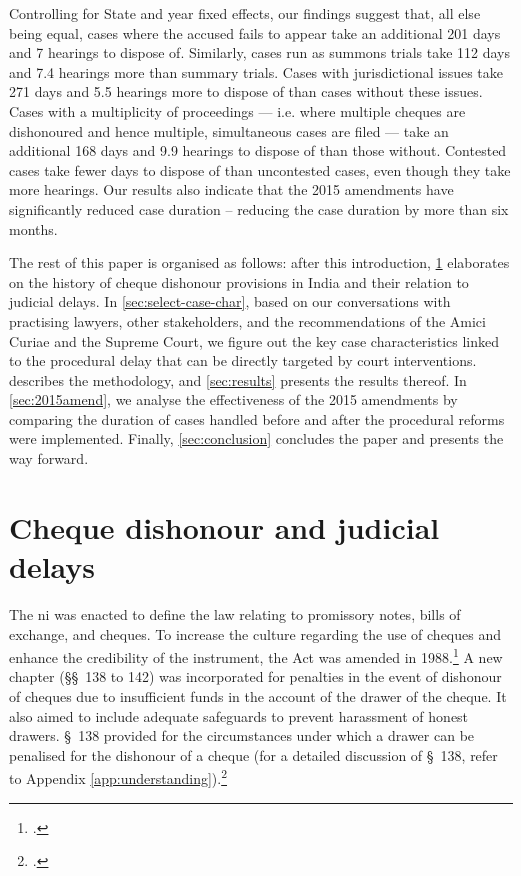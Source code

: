 \documentclass[12pt,a4paper]{article}
\begin{document}
Controlling for State and year fixed effects, our findings suggest that, all else being equal, cases where the accused fails to appear take an additional 201 days and 7 hearings to dispose of. Similarly, cases run as summons trials take 112 days and 7.4 hearings more than summary trials. Cases with jurisdictional issues take 271 days and 5.5 hearings more to dispose of than cases without these issues. Cases with a multiplicity of proceedings --- i.e. where multiple cheques are dishonoured and hence multiple, simultaneous cases are filed --- take an additional 168 days and 9.9 hearings to dispose of than those without. Contested cases take fewer days to dispose of than uncontested cases, even though they take more hearings. Our results also indicate that the 2015 amendments have significantly reduced case duration -- reducing the case duration by more than six months.

The rest of this paper is organised as follows: after this introduction, \cref{sec:history} elaborates on the history of cheque dishonour provisions in India and their relation to judicial delays. In \cref{sec:select-case-char}, based on our conversations with practising lawyers, other stakeholders, and the recommendations of the Amici Curiae and the Supreme Court, we figure out the key case characteristics linked to the procedural delay that can be directly targeted by court interventions.  describes the methodology, and \cref{sec:results} presents the results thereof. In \cref{sec:2015amend}, we analyse the effectiveness of the 2015 amendments by comparing the duration of cases handled before and after the procedural reforms were implemented. Finally, \cref{sec:conclusion} concludes the paper and presents the way forward.

\section{Cheque dishonour and judicial delays} \label{sec:history}

The \acrlong{ni} was enacted to define the law relating to promissory notes, bills of exchange, and cheques. To increase the culture regarding the use of cheques and enhance the credibility of the instrument, the Act was amended in 1988.\footcite{niAmend1988} A new chapter (\S\S~138 to 142) was incorporated for penalties in the event of dishonour of cheques due to insufficient funds in the account of the drawer of the cheque. It also aimed to include adequate safeguards to prevent harassment of honest drawers. \S~138 provided for the circumstances under which a drawer can be penalised for the dishonour of a cheque (for a detailed discussion of \S~138, refer to Appendix \ref{app:understanding}).\footcite{ind1881_niAct}
\end{document}
